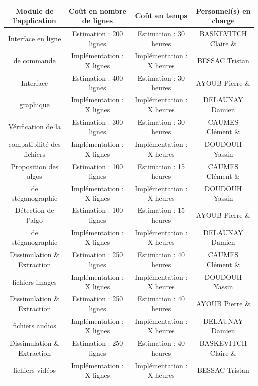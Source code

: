 \documentclass[11pt]{article}
\begin{document}
\small
\hspace{-1cm}
\begin{tabular}{|c|c|c|c|}
  \hline
  \textbf{Module de l'application} & \textbf{Coût en nombre de lignes} & \textbf{Coût en temps} & \textbf{Personnel(s) en charge} \\
  \hline
    Interface en ligne & Estimation : 200 lignes & Estimation : 30 heures & BASKEVITCH Claire \& \\ 
    de commande & Implémentation : X lignes & Implémentation : X heures & BESSAC Tristan \\
  \hline
  Interface & Estimation : 400 lignes & Estimation : 30 heures & AYOUB Pierre \& \\
  graphique & Implémentation : X lignes & Implémentation : X heures & DELAUNAY Damien \\
  \hline
  Vérification de la & Estimation : 300 lignes & Estimation : 30 heures& CAUMES Clément \& \\
   compatibilité des fichiers & Implémentation : X lignes & Implémentation : X heures & DOUDOUH Yassin \\
  \hline
    Proposition des algos & Estimation : 100 lignes & Estimation : 15 heures & CAUMES Clément \& \\
   de stéganographie & Implémentation : X lignes & Implémentation : X heures & DOUDOUH Yassin \\
  \hline
    Détection de l'algo & Estimation : 100 lignes & Estimation : 15 heures & AYOUB Pierre \& \\
   de stéganographie & Implémentation : X lignes & Implémentation : X heures & DELAUNAY Damien \\
  \hline
  Dissimulation \& Extraction & Estimation : 250 lignes & Estimation : 40 heures & CAUMES Clément \& \\
   fichiers images & Implémentation : X lignes & Implémentation : X heures & DOUDOUH Yassin \\
  \hline
  Dissimulation \& Extraction & Estimation : 250 lignes & Estimation : 40 heures & AYOUB Pierre \& \\
   fichiers audios & Implémentation : X lignes & Implémentation : X heures & DELAUNAY Damien \\
     \hline
  Dissimulation \& Extraction & Estimation : 250 lignes & Estimation : 40 heures & BASKEVITCH Claire \& \\
   fichiers vidéos & Implémentation : X lignes & Implémentation : X heures & BESSAC Tristan \\
  \hline
\end{tabular}
\normalsize
\end{document}
